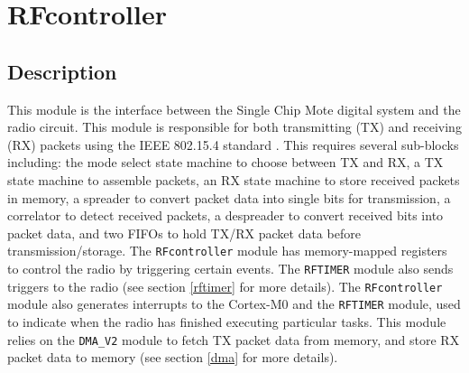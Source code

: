\section{RFcontroller} \label{rfcontroller}
\subsection{Description}
This module is the interface between the Single Chip Mote digital system and the radio circuit. This module is responsible for both transmitting (TX) and receiving (RX) packets using the IEEE 802.15.4 standard \cite{15-4-standard}. This requires several sub-blocks including: the mode select state machine to choose between TX and RX, a TX state machine to assemble packets, an RX state machine to store received packets in memory, a spreader to convert packet data into single bits for transmission, a correlator to detect received packets, a despreader to convert received bits into packet data, and two FIFOs to hold TX/RX packet data before transmission/storage. The \texttt{RFcontroller} module has memory-mapped registers to control the radio by triggering certain events. The \texttt{RFTIMER} module also sends triggers to the radio (see section \ref{rftimer} for more details). The \texttt{RFcontroller} module also generates interrupts to the Cortex-M0 and the \texttt{RFTIMER} module, used to indicate when the radio has finished executing particular tasks. This module relies on the \texttt{DMA\_V2} module to fetch TX packet data from memory, and store RX packet data to memory (see section \ref{dma} for more details).


